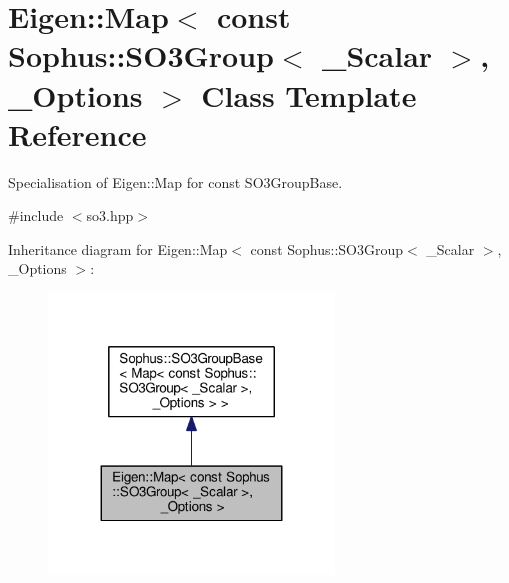 \hypertarget{class_eigen_1_1_map_3_01const_01_sophus_1_1_s_o3_group_3_01___scalar_01_4_00_01___options_01_4}{}\section{Eigen\+:\+:Map$<$ const Sophus\+:\+:S\+O3\+Group$<$ \+\_\+\+Scalar $>$, \+\_\+\+Options $>$ Class Template Reference}
\label{class_eigen_1_1_map_3_01const_01_sophus_1_1_s_o3_group_3_01___scalar_01_4_00_01___options_01_4}


Specialisation of Eigen\+::\+Map for const S\+O3\+Group\+Base.  




{\ttfamily \#include $<$so3.\+hpp$>$}



Inheritance diagram for Eigen\+:\+:Map$<$ const Sophus\+:\+:S\+O3\+Group$<$ \+\_\+\+Scalar $>$, \+\_\+\+Options $>$\+:
\nopagebreak
\begin{figure}[H]
\begin{center}
\leavevmode
\includegraphics[width=215pt]{class_eigen_1_1_map_3_01const_01_sophus_1_1_s_o3_group_3_01___scalar_01_4_00_01___options_01_4__inherit__graph}
\end{center}
\end{figure}


